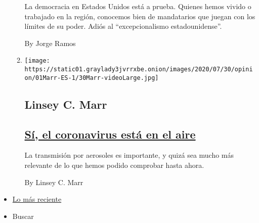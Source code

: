 \begin{enumerate}
\begin{enumerate}
    La democracia en Estados Unidos está a prueba. Quienes hemos vivido
    o trabajado en la región, conocemos bien de mandatarios que juegan
    con los límites de su poder. Adiós al ``excepcionalismo
    estadounidense''.

    By Jorge Ramos
  \item
    \texttt{[image: https://static01.graylady3jvrrxbe.onion/images/2020/07/30/opinion/01Marr-ES-1/30Marr-videoLarge.jpg]}

    \hypertarget{linsey-c-marr}{%
    \subsection{Linsey C. Marr}\label{linsey-c-marr}}

    \hypertarget{suxed-el-coronavirus-estuxe1-en-el-aire}{%
    \subsection{\texorpdfstring{\href{/es/2020/08/01/espanol/opinion/coronavirus-aire.html}{Sí,
    el coronavirus está en el
    aire}}{Sí, el coronavirus está en el aire}}\label{suxed-el-coronavirus-estuxe1-en-el-aire}}

    La transmisión por aerosoles es importante, y quizá sea mucho más
    relevante de lo que hemos podido comprobar hasta ahora.

    By Linsey C. Marr
  \end{enumerate}
\end{enumerate}

\begin{itemize}
\tightlist
\item
  \protect\hyperlink{stream-panel}{Lo más reciente}
\item
  Buscar
\end{itemize}

